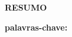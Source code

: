 \begin{center}
    \textbf{RESUMO}
    \vspace{60pt}
\end{center}



\vspace{20pt}

\textbf{palavras-chave:}
